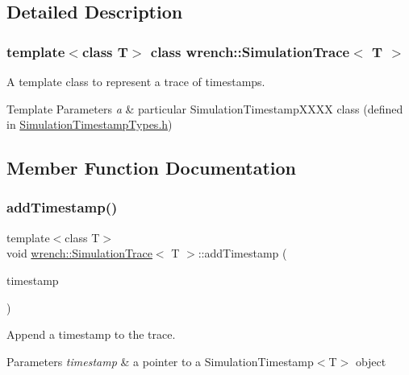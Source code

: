 \subsection{Detailed Description}
\subsubsection*{template$<$class T$>$\newline
class wrench\+::\+Simulation\+Trace$<$ T $>$}

A template class to represent a trace of timestamps. 


\begin{DoxyTemplParams}{Template Parameters}
{\em a} & particular Simulation\+Timestamp\+X\+X\+XX class (defined in \hyperlink{_simulation_timestamp_types_8h_source}{Simulation\+Timestamp\+Types.\+h}) \\
\hline
\end{DoxyTemplParams}


\subsection{Member Function Documentation}
\mbox{\label{classwrench_1_1_simulation_trace_a95e17346a956bc157a6aaec1add38bdc}} 
\subsubsection{\texorpdfstring{add\+Timestamp()}{addTimestamp()}}
{\footnotesize\ttfamily template$<$class T$>$ \\
void \hyperlink{classwrench_1_1_simulation_trace}{wrench\+::\+Simulation\+Trace}$<$ T $>$\+::add\+Timestamp (\begin{DoxyParamCaption}\item[{\hyperlink{classwrench_1_1_simulation_timestamp}{Simulation\+Timestamp}$<$ T $>$ $\ast$}]{timestamp }\end{DoxyParamCaption})\hspace{0.3cm}{\ttfamily [inline]}}



Append a timestamp to the trace. 


\begin{DoxyParams}{Parameters}
{\em timestamp} & a pointer to a Simulation\+Timestamp$<$\+T$>$ object \\
\hline
\end{DoxyParams}

